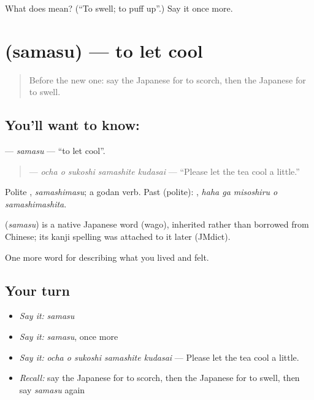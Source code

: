 \begin{tcolorbox}[breakable,colback=teal!4,colframe=teal!35!black,title={Before you move on}]
What does  mean? (\textquotedblleft{}To swell; to puff up\textquotedblright{}.) Say it once more.
\end{tcolorbox}
\section[\texorpdfstring{\ja{さます} (samasu)}{さます (samasu)}]{ (samasu) — to let cool}

\label{lesson:JA-C473-samasu}



\begin{quote}
Before the new one: say the Japanese for to scorch, then the Japanese for to swell.
\end{quote}

\subsection*{You'll want to know: }
\textbf{} — \emph{samasu} — \textquotedblleft{}to let cool\textquotedblright{}.

\begin{quote}
\textbf{   } — \emph{ocha o sukoshi samashite kudasai} — \textquotedblleft{}Please let the tea cool a little.\textquotedblright{}
\end{quote}

Polite \textbf{}, \emph{samashimasu}; a godan verb. Past (polite): \textbf{  }, \emph{haha ga misoshiru o samashimashita}.

\begin{cousinweb}
\textbf{} (\emph{samasu}) is a native Japanese word (wago), inherited rather than borrowed from Chinese; its kanji spelling was attached to it later (JMdict).
\end{cousinweb}

\begin{grammarlens}[title={What you've built}]
One more word for describing what you lived and felt.
\end{grammarlens}

\subsection*{Your turn}
\begin{itemize}
\raggedright
  \item \emph{Say it:} \emph{samasu}
  \item \emph{Say it:} \emph{samasu}, once more
  \item \emph{Say it:} \emph{ocha o sukoshi samashite kudasai} — Please let the tea cool a little.
  \item \emph{Recall:} say the Japanese for to scorch, then the Japanese for to swell, then say \emph{samasu} again
\end{itemize}

